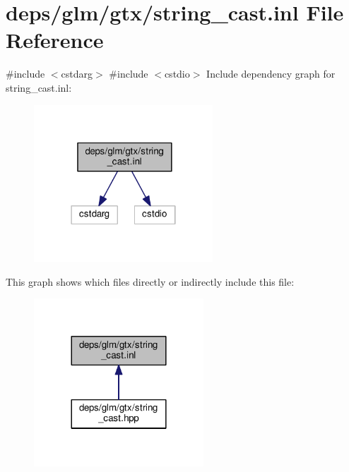 \hypertarget{string__cast_8inl}{}\section{deps/glm/gtx/string\+\_\+cast.inl File Reference}
\label{string__cast_8inl}
{\ttfamily \#include $<$cstdarg$>$}\newline
{\ttfamily \#include $<$cstdio$>$}\newline
Include dependency graph for string\+\_\+cast.\+inl\+:
\nopagebreak
\begin{figure}[H]
\begin{center}
\leavevmode
\includegraphics[width=190pt]{de/df0/string__cast_8inl__incl}
\end{center}
\end{figure}
This graph shows which files directly or indirectly include this file\+:
\nopagebreak
\begin{figure}[H]
\begin{center}
\leavevmode
\includegraphics[width=180pt]{d8/dea/string__cast_8inl__dep__incl}
\end{center}
\end{figure}
